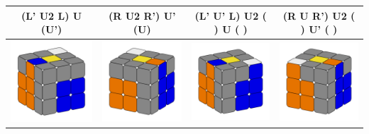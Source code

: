 \documentclass[12pt, a3paper]{article}
\newcommand{\scale}{1}
\begin{document}
\begin{center}
\begin{longtable}{c|c||c|c}
	(L' U2 L) U (U') & (R U2 R') U' (U) & (L' U' L) U2 ( ) U ( ) & (R U R') U2 ( ) U' ( ) \\
	\hline
	\hline
	\includegraphics[scale=\scale]{13_left} & \includegraphics[scale=\scale]{13_right}  &  \includegraphics[scale=\scale]{14_left} & \includegraphics[scale=\scale]{14_right} \\

\end{longtable}
\end{center}
\end{document}
